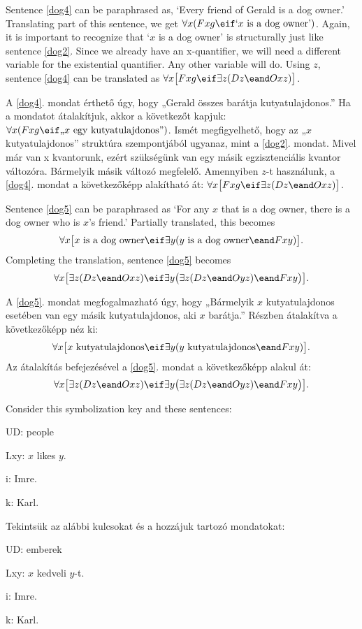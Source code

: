 Sentence \ref{dog4} can be paraphrased as, `Every friend of Gerald is a dog owner.' Translating part of this sentence, we get $\forall x(Fxg \eif\mbox{`$x$ is a dog owner'})$. Again, it is important to recognize that `$x$ is a dog owner' is structurally just like sentence \ref{dog2}. Since we already have an x-quantifier, we will need a different variable for the existential quantifier. Any other variable will do. Using $z$, sentence \ref{dog4} can be translated as $\forall x\bigl[Fxg \eif\exists z(Dz \eand Oxz)\bigr]$.

A \ref{dog4}. mondat érthető úgy, hogy „Gerald összes barátja kutyatulajdonos.” Ha a mondatot átalakítjuk, akkor a következőt kapjuk: $\forall x(Fxg \eif\mbox{„$x$ egy kutyatulajdonos”})$. Ismét megfigyelhető, hogy az „$x$ kutyatulajdonos” struktúra szempontjából ugyanaz, mint a \ref{dog2}. mondat. Mivel már van x kvantorunk, ezért szükségünk van egy másik egzisztenciális kvantor változóra. Bármelyik másik változó megfelelő. Amennyiben $z$-t használunk, a \ref{dog4}. mondat a következőképp alakítható át: $\forall x\bigl[Fxg \eif\exists z(Dz \eand Oxz)\bigr]$.

Sentence \ref{dog5} can be paraphrased as `For any $x$ that is a dog owner, there is a dog owner who is $x$'s friend.' Partially translated, this becomes $$\forall x\bigl[\mbox{$x$ is a dog owner}\eif\exists y(\mbox{$y$ is a dog owner}\eand Fxy)\bigr].$$ Completing the translation, sentence \ref{dog5} becomes $$\forall x\bigl[\exists z(Dz \eand Oxz)\eif\exists y\bigl(\exists z(Dz \eand Oyz)\eand Fxy\bigr)\bigr].$$

A \ref{dog5}. mondat megfogalmazható úgy, hogy „Bármelyik $x$ kutyatulajdonos esetében van egy másik kutyatulajdonos, aki $x$ barátja.” Részben átalakítva a következőképp néz ki: $$\forall x\bigl[\mbox{$x$ kutyatulajdonos}\eif\exists y(\mbox{$y$ kutyatulajdonos}\eand Fxy)\bigr].$$ Az átalakítás befejezésével a \ref{dog5}. mondat a következőképp alakul át: $$\forall x\bigl[\exists z(Dz \eand Oxz)\eif\exists y\bigl(\exists z(Dz \eand Oyz)\eand Fxy\bigr)\bigr].$$

Consider this symbolization key and these sentences:
\begin{ekey}
\item[UD:] people
\item[Lxy:] $x$ likes $y$.
\item[i:] Imre.
\item[k:] Karl.
\end{ekey}

Tekintsük az alábbi kulcsokat és a hozzájuk tartozó mondatokat:
\begin{ekey}
\item[UD:] emberek
\item[Lxy:] $x$ kedveli $y$-t.
\item[i:] Imre.
\item[k:] Karl.
\end{ekey}

